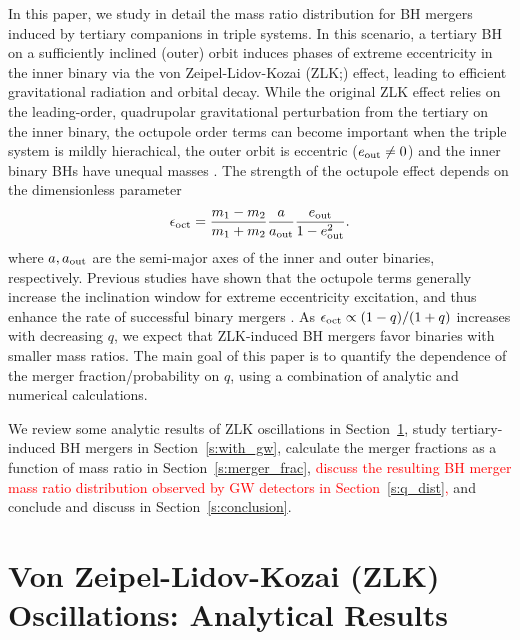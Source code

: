 \documentclass[
        fleqn,
        usenatbib,
    ]{mnras}
\begin{document}
In this paper, we study in detail the mass ratio distribution for BH mergers
induced by tertiary companions in triple systems. In this scenario, a tertiary
BH on a sufficiently inclined (outer) orbit induces phases of extreme
eccentricity in the inner binary via the von Zeipel-Lidov-Kozai
(ZLK;\@\citealp{zeipel, lidov, kozai}) effect, leading to efficient gravitational
radiation and orbital decay.  While the original ZLK effect relies on the
leading-order, quadrupolar gravitational perturbation from the tertiary on the
inner binary, the octupole order terms can become important when the triple
system is mildly hierachical, the outer orbit is eccentric ($e_{\rm out} \neq 0$)
and the inner binary BHs have unequal masses \citep[e.g.,][]{ford2000secular,
blaes2002kozai, lithwick2011eccentric, LML15}. The strength of the
octupole effect depends on the dimensionless parameter
\begin{equation}
    \epsilon_{\rm oct} = \frac{m_1 - m_2}{m_1 + m_2} \frac{a}{a_{\rm out}}
        \frac{e_{\rm out}}{1 - e_{\rm out}^2}.\label{eq:eps_oct}
\end{equation}
where $a, a_{\rm out}$ are the semi-major axes of the inner and outer binaries,
respectively. Previous studies have shown that the octupole terms generally
increase the inclination window for extreme eccentricity excitation, and thus
enhance the rate of successful binary mergers \citep{LL18}. As $\epsilon_{\rm
oct} \propto (1-q)/(1+q)$ increases with decreasing $q$, we expect that
ZLK-induced BH mergers favor binaries with smaller mass ratios. The main goal of
this paper is to quantify the dependence of the merger fraction/probability on
$q$, using a combination of analytic and numerical calculations.

We review some analytic results of ZLK oscillations in
Section~\ref{s:background}, study tertiary-induced BH mergers in
Section~\ref{s:with_gw}, calculate the merger fractions as a function of mass
ratio in Section~\ref{s:merger_frac}, \textcolor{red}{discuss the resulting BH
merger mass ratio distribution observed by GW detectors in
Section~\ref{s:q_dist},} and conclude and discuss in Section~\ref{s:conclusion}.

\section{Von Zeipel-Lidov-Kozai (ZLK) Oscillations: Analytical
Results}\label{s:background}
\end{document}
